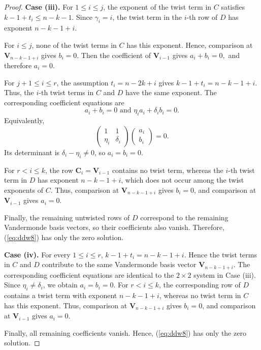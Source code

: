\documentclass[10pt,a4paper]{amsart}
\begin{document}
\begin{proof}
\medskip
\noindent\textbf{Case (iii).}
For \(1\le i\le j\), the exponent of the twist term in \(C\) satisfies
\(
k-1+t_i\le n-k-1.
\)
Since \(\gamma_i=i\), the twist term in the \(i\)-th row of \(D\) has exponent
\(
n-k-1+i.
\)

For \(i\le j\), none of the twist terms in \(C\) has this exponent. Hence, comparison at \(\mathbf{V}_{n-k-1+i}\) gives
\(
b_i=0.
\)
Then the coefficient of \(\mathbf{V}_{i-1}\) gives
\(
a_i+b_i=0,
\)
and therefore \(a_i=0\).

For \(j+1\le i\le r\), the assumption \(t_i=n-2k+i\) gives
\(
k-1+t_i=n-k-1+i.
\)
Thus, the \(i\)-th twist terms in \(C\) and \(D\) have the same exponent. The corresponding coefficient equations are
\[
a_i+b_i=0 \text{ and } \eta_i a_i+\delta_i b_i=0.
\]
Equivalently,
\[
\begin{pmatrix}
1&1\\
\eta_i&\delta_i
\end{pmatrix}
\begin{pmatrix}
a_i\\
b_i
\end{pmatrix}
=0.
\]
Its determinant is \(\delta_i-\eta_i\ne0\), so \(a_i=b_i=0\).

For \(r<i\le k\), the row
\(
\mathbf{C}_i=\mathbf{V}_{i-1}
\)
contains no twist term, whereas the \(i\)-th twist term in \(D\) has exponent \(n-k-1+i\), which does not occur among the twist exponents of \(C\). Thus, comparison at \(\mathbf{V}_{n-k-1+i}\) gives \(b_i=0\), and comparison at \(\mathbf{V}_{i-1}\) gives \(a_i=0\).

Finally, the remaining untwisted rows of \(D\) correspond to the remaining Vandermonde basis vectors, so their coefficients also vanish. Therefore, (\ref{eq:ddw8}) has only the zero solution.

\medskip
\noindent\textbf{Case (iv).}
For every \(1\le i\le r\),
\(
k-1+t_i=n-k-1+i.
\)
Hence the twist terms in \(C\) and \(D\) contribute to the same Vandermonde basis vector \(\mathbf{V}_{n-k-1+i}\). The corresponding coefficient equations are identical to the \(2\times2\) system in Case (iii). Since \(\eta_i\ne\delta_i\), we obtain
\(
a_i=b_i=0.
\)
For \(r<i\le k\), the corresponding row of \(D\) contains a twist term with exponent \(n-k-1+i\), whereas no twist term in \(C\) has this exponent. Thus, comparison at \(\mathbf{V}_{n-k-1+i}\) gives \(b_i=0\), and comparison at \(\mathbf{V}_{i-1}\) gives \(a_i=0\).

Finally, all remaining coefficients vanish. Hence, (\ref{eq:ddw8}) has only the zero solution.


\end{proof}
\end{document}

